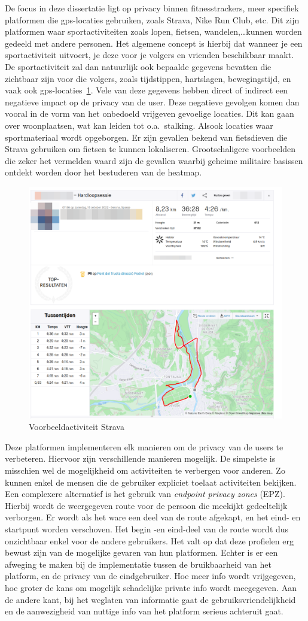 De focus in deze dissertatie ligt op privacy binnen fitnesstrackers, meer
specifiek platformen die gps-locaties gebruiken, zoals Strava, Nike Run Club,
etc. Dit zijn platformen waar sportactiviteiten zoals lopen, fietsen,
wandelen,\ldots kunnen worden gedeeld met andere personen. Het algemene concept
is hierbij dat wanneer je een sportactiviteit uitvoert, je deze voor je volgers
en vrienden beschikbaar maakt. De sportactiviteit zal dan natuurlijk ook
bepaalde gegevens bevatten die zichtbaar zijn voor die volgers, zoals
tijdstippen, hartslagen, bewegingstijd, en vaak ook
gps-locaties~\ref{fig:activityExample}. Vele van deze gegevens hebben direct of
indirect een negatieve impact op de privacy van de user. Deze negatieve
gevolgen komen dan vooral in de vorm van het onbedoeld vrijgeven gevoelige
locaties. Dit kan gaan over woonplaatsen, wat kan leiden tot o.a.\ stalking.
Alsook locaties waar sportmateriaal wordt opgeborgen. Er zijn gevallen bekend
van fietsdieven die Strava gebruiken om fietsen te kunnen
lokaliseren\cite{Sportapp72:online}\cite{Cyclistw89:online}. Grootschaligere
voorbeelden die zeker het vermelden waard zijn de gevallen waarbij geheime
militaire basissen ontdekt worden door het bestuderen van de heatmap.
\begin{figure}
    \centering
    \includegraphics[width=0.5\linewidth]{fig/VoorbeeldActiviteit_Cropped.png}
    \caption{Voorbeeldactiviteit Strava}\label{fig:activityExample}
\end{figure}

Deze platformen implementeren elk manieren om de privacy van de users te
verbeteren. Hiervoor zijn verschillende manieren mogelijk. De simpelste is
misschien wel de mogelijkheid om activiteiten te verbergen voor anderen. Zo
kunnen enkel de mensen die de gebruiker expliciet toelaat activiteiten
bekijken. Een complexere alternatief is het gebruik van \textit{endpoint privacy
    zones} (EPZ). Hierbij wordt de weergegeven route voor de persoon die meekijkt
gedeeltelijk verborgen. Er wordt als het ware een deel van de route afgekapt,
en het eind- en startpunt worden verschoven. Het begin -en eind-deel van de
route wordt dus onzichtbaar enkel voor de andere gebruikers. Het valt op dat
deze profielen erg bewust zijn van de mogelijke gevaren van hun platformen.
Echter is er een afweging te maken bij de implementatie tussen de bruikbaarheid
van het platform, en de privacy van de eindgebruiker. Hoe meer info wordt
vrijgegeven, hoe groter de kans om mogelijk schadelijke private info wordt
meegegeven. Aan de andere kant, bij het weglaten van informatie gaat de
gebruiksvriendelijkheid en de aanwezigheid van nuttige info van het platform
serieus achteruit gaat.


